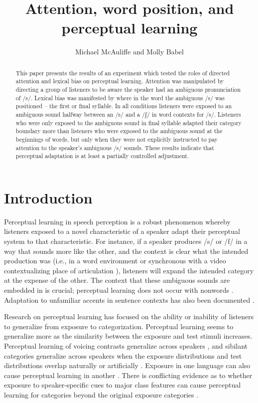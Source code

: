 \documentclass[a4paper,11pt,twocolumn]{article}
\title{Attention, word position, and perceptual learning}
\author{Michael McAuliffe and Molly Babel}
\begin{document}
\maketitle

\begin{abstract}
This paper presents the results of an experiment which tested the roles of directed attention and lexical bias on perceptual learning. Attention was manipulated by directing a group of listeners to be aware the speaker had an ambiguous pronunciation of /s/. Lexical bias was manifested by where in the word the ambiguous /s/ was positioned -- the first or final syllable. In all conditions listeners were exposed to an ambiguous sound halfway between an /s/ and a /ʃ/ in word contexts for /s/.  Listeners who were only exposed to the ambiguous sound in final syllable adapted their category boundary more than listeners who were exposed to the ambiguous sound at the beginnings of words, but only when they were not explicitly instructed to pay attention to the speaker's ambiguous /s/ sounds. These results indicate that perceptual adaptation is at least a partially controlled adjustment. 
\end{abstract}



\section{Introduction}

Perceptual learning in speech perception is a robust phenomenon whereby listeners exposed to a novel characteristic of a speaker adapt their perceptual system to that characteristic. For instance, if a speaker produces /s/ or /f/ in a way that sounds more like the other, and the context is clear what the intended production was (i.e., in a word environment \cite{Norris2003} or synchronous with a video contextualizing place of articulation \cite{Bertelson2003}), listeners will expand the intended category at the expense of the other.  The context that these ambiguous sounds are embedded in is crucial; perceptual learning does not occur with nonwords \cite{Norris2003}. Adaptation to unfamiliar accents in sentence contexts has also been documented \cite{Bradlow2008}.

Research on perceptual learning has focused on the ability or inability of listeners to generalize from exposure to categorization.  Perceptual learning seems to generalize more as the similarity between the exposure and test stimuli increases. Perceptual learning of voicing contrasts generalize across speakers \cite{Kraljic2007}, and sibilant categories generalize across speakers when the exposure distributions and test distributions overlap naturally \cite{Kraljic2005} or artificially \cite{Eisner2006}. Exposure in one language can also cause perceptual learning in another \cite{Reinisch2013}.  There is conflicting evidence as to whether exposure to speaker-specific cues to major class features can cause perceptual learning for categories beyond the original exposure categories \cite{Kraljic2006,Reinisch2014}.  
\end{document}
